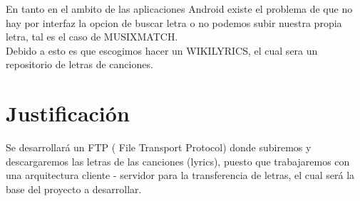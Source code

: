 \documentclass[12pt,A4]{article}
\begin{document}
En tanto en el ambito de las aplicaciones Android existe el problema de que no hay por interfaz la opcion de buscar letra o no podemos subir nuestra propia letra, tal es el caso de MUSIXMATCH.\\

Debido a esto es que escogimos hacer un WIKILYRICS, el cual sera un repositorio de letras de canciones.

\section*{\centering Justificación}
Se desarrollará un FTP ( File Transport Protocol) donde subiremos y descargaremos las letras de las canciones (lyrics), puesto que trabajaremos con una arquitectura cliente - servidor para la transferencia de letras, el cual será la base del proyecto a desarrollar.
\end{document}
